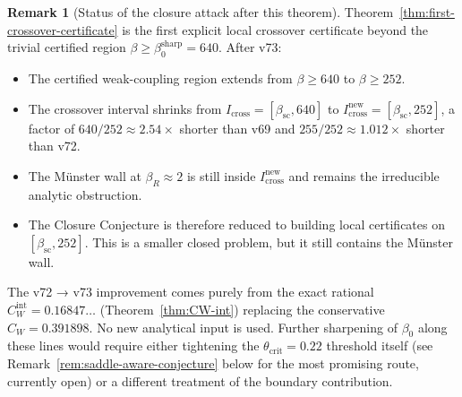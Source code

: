 \documentclass[11pt]{article}
\theoremstyle{definition}
\newtheorem{remark}[theorem]{Remark}
\newcommand{\betasc}{\beta_{\mathrm{sc}}}
\begin{document}
\begin{remark}[Status of the closure attack after this theorem]
\label{rem:closure-status-after-csharp-int}
Theorem~\ref{thm:first-crossover-certificate} is the first explicit
local crossover certificate beyond the trivial certified region
$\beta\ge\beta_0^{\mathrm{sharp}}=640$.  After v73:
\begin{itemize}[nosep]
\item The certified weak-coupling region extends from
$\beta\ge 640$ to $\beta\ge 252$.
\item The crossover interval shrinks from
$I_{\mathrm{cross}}=[\betasc,640]$ to
$I_{\mathrm{cross}}^{\mathrm{new}}=[\betasc,252]$, a factor of
$640/252\approx 2.54\times$ shorter than v69 and $255/252\approx 1.012\times$
shorter than v72.
\item The M\"unster wall at $\beta_R\approx 2$ is still inside
$I_{\mathrm{cross}}^{\mathrm{new}}$ and remains the irreducible
analytic obstruction.
\item The Closure Conjecture is therefore reduced to building local
certificates on $[\betasc, 252]$.  This is a smaller closed problem,
but it still contains the M\"unster wall.
\end{itemize}

The v72 → v73 improvement comes purely from the exact rational
$C_W^{\mathrm{int}}=0.16847\ldots$ \textup{(}Theorem~\ref{thm:CW-int}\textup{)}
replacing the conservative $C_W=0.391898$.  No new analytical input
is used.  Further sharpening of $\beta_0$ along these lines would
require either tightening the $\theta_{\mathrm{crit}}=0.22$ threshold
itself \textup{(}see Remark~\ref{rem:saddle-aware-conjecture} below
for the most promising route, currently open\textup{)} or a different
treatment of the boundary contribution.
\end{remark}
\end{document}
